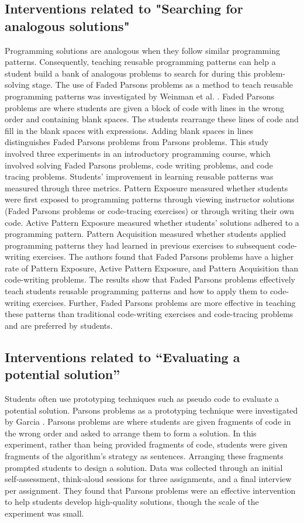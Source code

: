 \documentclass[sigconf,authorversion,nonacm]{acmart}
\begin{document}
\subsection{Interventions related to "Searching for analogous solutions"}
Programming solutions are analogous when they follow similar programming patterns. Consequently, teaching reusable programming patterns can help a student build a bank of analogous problems to search for during this problem-solving stage. The use of Faded Parsons problems as a method to teach reusable programming patterns was investigated by Weinman et al. \cite{weinman2021}. Faded Parsons problems are where students are given a block of code with lines in the wrong order and containing blank spaces. The students rearrange these lines of code and fill in the blank spaces with expressions. Adding blank spaces in lines distinguishes Faded Parsons problems from Parsons problems. This study involved three experiments in an introductory programming course, which involved solving Faded Parsons problems, code writing problems, and code tracing problems. Students' improvement in learning reusable patterns was measured through three metrics. Pattern Exposure measured whether students were first exposed to programming patterns through viewing instructor solutions (Faded Parsons problems or code-tracing exercises) or through writing their own code. Active Pattern Exposure measured whether students' solutions adhered to a programming pattern. Pattern Acquisition measured whether students applied programming patterns they had learned in previous exercises to subsequent code-writing exercises. The authors found that Faded Parsons problems have a higher rate of Pattern Exposure, Active Pattern Exposure, and Pattern Acquisition than code-writing problems. The results show that Faded Parsons problems effectively teach students reusable programming patterns and how to apply them to code-writing exercises. Further, Faded Parsons problems are more effective in teaching these patterns than traditional code-writing exercises and code-tracing problems and are preferred by students.

\subsection{Interventions related to “Evaluating a potential solution”}
Students often use prototyping techniques such as pseudo code to evaluate a potential solution. Parsons problems as a prototyping technique were investigated by Garcia \cite{garcia2021}. Parsons problems are where students are given fragments of code in the wrong order and asked to arrange them to form a solution. In this experiment, rather than being provided fragments of code, students were given fragments of the algorithm’s strategy as sentences. Arranging these fragments prompted students to design a solution. Data was collected through an initial self-assessment, think-aloud sessions for three assignments, and a final interview per assignment. They found that Parsons problems were an effective intervention to help students develop high-quality solutions, though the scale of the experiment was small.
\end{document}
